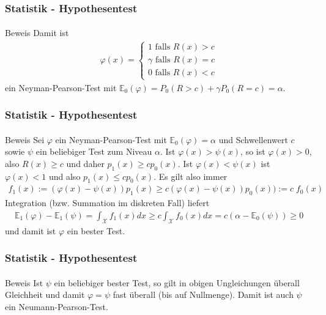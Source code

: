 \documentclass{beamer}
\begin{document}
\begin{frame}
    \frametitle{Statistik - Hypothesentest}
\framesubtitle{}
\begin{block}{Beweis}
Damit ist 
\begin{align*}
 \varphi(x) = \begin{cases} 1 \text{ falls } R(x) > c \\  \gamma  \text{ falls } R(x) = c \\ 0 \text{ falls } R(x) < c  \end{cases}
\end{align*}
ein Neyman-Pearson-Test mit $\mathbb{E}_0(\varphi) = P_0(R > c) + \gamma P_0(R=c) = \alpha$.
\end{block}

 \end{frame}



\begin{frame}
    \frametitle{Statistik - Hypothesentest}
\framesubtitle{}
\begin{block}{Beweis}
Sei $\varphi$ ein Neyman-Pearson-Test  mit $\mathbb{E}_0(\varphi) = \alpha$ und Schwellenwert $c$ sowie $\psi$ ein beliebiger Test zum Niveau $\alpha$. Ist $\varphi(x) > \psi(x)$, so ist $\varphi(x) > 0$, also $R(x) \geq c$ und daher $p_1(x) \geq c p_0(x)$. Ist $\varphi(x) < \psi(x)$ ist $\varphi(x) <1$ und also $p_1(x) \leq c p_0(x)$. Es gilt also immer
\begin{align*}
f_1(x) := (\varphi(x) - \psi(x))p_1(x) \geq c ( \varphi(x) - \psi(x))p_0(x) ) := c \; f_0(x)
\end{align*}
Integration (bzw. Summation im diskreten Fall) liefert
\begin{align*}
\mathbb{E}_1(\varphi) - \mathbb{E}_1(\psi) = \int_{\mathcal{X}} f_1(x) dx \geq c   \int_{\mathcal{X}} f_0(x) dx = c(\alpha -  \mathbb{E}_0(\psi)  ) \geq 0
\end{align*}
und damit ist $\varphi$ ein bester Test.
\end{block}

 \end{frame}

\begin{frame}
    \frametitle{Statistik - Hypothesentest}
\framesubtitle{}
\begin{block}{Beweis}
Ist  $\psi$ ein beliebiger bester Test, so gilt in obigen Ungleichungen überall Gleichheit und damit $\varphi = \psi$ fast überall (bis auf Nullmenge). Damit ist auch $\psi$ ein Neumann-Pearson-Test.
\end{block}

 \end{frame}
\end{document}
